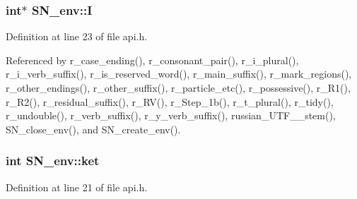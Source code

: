 {\subsubsection[{I}]{\setlength{\rightskip}{0pt plus 5cm}int$\ast$ {\bf SN\_\-env::I}}}
\label{structSN__env_73c996c34c706b1c11a4b3b273d99f35}




Definition at line 23 of file api.h.

Referenced by r\_\-case\_\-ending(), r\_\-consonant\_\-pair(), r\_\-i\_\-plural(), r\_\-i\_\-verb\_\-suffix(), r\_\-is\_\-reserved\_\-word(), r\_\-main\_\-suffix(), r\_\-mark\_\-regions(), r\_\-other\_\-endings(), r\_\-other\_\-suffix(), r\_\-particle\_\-etc(), r\_\-possessive(), r\_\-R1(), r\_\-R2(), r\_\-residual\_\-suffix(), r\_\-RV(), r\_\-Step\_\-1b(), r\_\-t\_\-plural(), r\_\-tidy(), r\_\-undouble(), r\_\-verb\_\-suffix(), r\_\-y\_\-verb\_\-suffix(), russian\_\-UTF\_\_\-stem(), SN\_\-close\_\-env(), and SN\_\-create\_\-env().\hypertarget{structSN__env_838739ee60904661873995471c80bac5}{
\subsubsection[{ket}]{\setlength{\rightskip}{0pt plus 5cm}int {\bf SN\_\-env::ket}}}
\label{structSN__env_838739ee60904661873995471c80bac5}




Definition at line 21 of file api.h.

